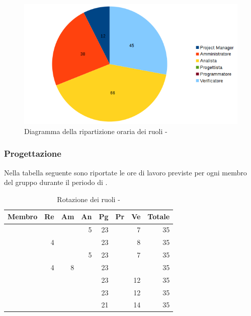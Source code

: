\documentclass[12pt,a4paper]{article}
\begin{document}
\begin{center}
	\begin{figure}[H]
		\centering
		\includegraphics[width=\textwidth]{../img/diagrammaTortaAnalisiTotaleOre.png}
		\caption{Diagramma della ripartizione oraria dei ruoli - \FA{}}
	\end{figure}
\end{center}

\newpage
\subsubsection{Progettazione}

Nella tabella seguente sono riportate le ore di lavoro previste per ogni membro del gruppo durante il periodo di \FP.

\begin{table}[H]
	\begin{center}
		\begin{tabular}{l r r r r r r r}
			\toprule
			\textbf{Membro}	&	\textbf{Re}	&	\textbf{Am}	& \textbf{An} & \textbf{Pg} & \textbf{Pr} & \textbf{Ve} & \textbf{Totale}\\
			\midrule
			\midrule
			\IB{} & & & 5 & 23 & & 7 & 35 \\
			\midrule
			\AB{} & 4 & & & 23 & & 8 & 35 \\
			\midrule
			\NDC{} & & & 5 & 23 & & 7 & 35 \\
			\midrule
			\TP{} & 4 & 8 & & 23 & & & 35 \\
			\midrule
			\WS{} & & & & 23 & & 12 & 35 \\
			\midrule
			\AVE{} & & & & 23 & & 12 & 35 \\
			\midrule
			\AVI{} & & & & 21 & & 14 & 35 \\
			\bottomrule
		\end{tabular}
		\caption{Rotazione dei ruoli - \FPA{}}
	\end{center}
\end{table}
\end{document}
